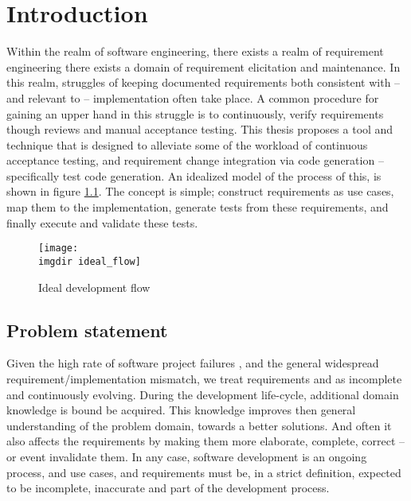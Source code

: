 \chapter{Introduction}


Within the realm of software engineering, there exists a realm of requirement engineering there exists a domain of requirement elicitation and maintenance. In this realm, struggles of keeping documented requirements both consistent with -- and relevant to -- implementation often take place. A common procedure for gaining an upper hand in this struggle is to continuously, verify requirements though reviews and manual acceptance testing. This thesis proposes a tool and technique that is designed to alleviate some of the workload of continuous acceptance testing, and requirement change integration via code generation -- specifically test code generation. An idealized model of the process of this, is shown in figure \ref{fig:ideal_flow}. The concept is simple; construct requirements as use cases, map them to the implementation, generate tests from these requirements, and finally execute and validate these tests.
\begin{figure}[!htbp]
\centering
\texttt{[image: \\imgdir ideal\_flow]}
\caption{Ideal development flow}
\label{fig:ideal_flow}
\end{figure}
\section{Problem statement}
Given the high rate of software project failures\cite{verner2008} \cite{charette2005}, and the general widespread requirement/implementation mismatch, we treat requirements and as incomplete and continuously evolving.
During the development life-cycle, additional domain knowledge is bound be acquired. This knowledge improves then general understanding of the problem domain, towards a better solutions. And often it also affects the requirements by making them more elaborate, complete, correct -- or event invalidate them. In any case, software development is an ongoing process, and use cases, and requirements must be, in a strict definition, expected to be incomplete, inaccurate and part of the development process.\bigskip

